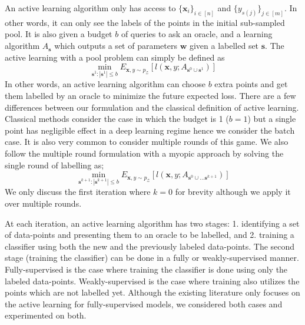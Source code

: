 \documentclass{article}
\begin{document}
An active learning algorithm only has access to $\{\mathbf{x}_i\}_{i \in [n]}$ and $\{y_{s(j)}\}_{j \in [m] }$. In other words, it can only see the labels of the points in the initial sub-sampled pool. It is also given a budget $b$ of queries to ask an oracle, and a learning algorithm $A_{\mathbf{s}}$ which outputs a set of parameters $\mathbf{w}$ given a labelled set $\mathbf{s}$. The active learning with a pool problem can simply be defined as
\begin{equation}
\min_{\mathbf{s}^1 : |\mathbf{s}^1| \leq b} E_{\mathbf{x},y \sim p_\mathcal{Z}} [l(\mathbf{x},y; A_{\mathbf{s}^0 \cup \mathbf{s}^1})]
\end{equation}
In other words, an active learning algorithm can choose $b$ extra points and get them labelled by an oracle to minimize the future expected loss. There are a few differences between our formulation and the classical definition of active learning. Classical methods consider the case in which the budget is 1 ($b=1$) but a single point has negligible effect in a deep learning regime hence we consider the batch case. It is also very common to consider multiple rounds of this game. %
We also follow the multiple round formulation with a myopic approach by solving the single round of labelling as;
\begin{equation}
\min_{\mathbf{s}^{k+1} : |\mathbf{s}^{k+1}| \leq b} E_{\mathbf{x},y \sim p_\mathcal{Z}} [l(\mathbf{x},y;A_{\mathbf{s}^{0} \cup \ldots  \mathbf{s}^{k+1}})]
\end{equation}
We only discuss the first iteration where $k=0$ for brevity although we apply it over multiple rounds. 

At each iteration, an active learning algorithm has two stages: 1. identifying a set of data-points and presenting them to an oracle to be labelled, and 2. training a classifier using both the new and the previously labeled data-points. The second stage (training the classifier) can be done in a fully or weakly-supervised manner. Fully-supervised is the case where training the classifier is done using only the labeled data-points. Weakly-supervised is the case where training also utilizes the points which are not labelled yet. Although the existing literature only focuses on the active learning for fully-supervised models, we considered both cases and experimented on both. 
\end{document}
